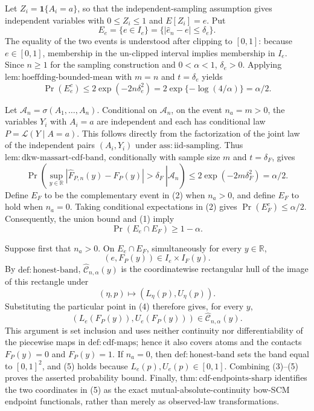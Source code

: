 Let \(Z_i=\mathbf 1\{A_i=a\}\), so that the independent-sampling assumption gives independent variables with \(0\le Z_i\le1\) and \(E[Z_i]=e\).  Put
\[
 E_e=\{e\in I_e\}=\{|\widehat e_n-e|\le\delta_e\}.
\]
The equality of the two events is understood after clipping to \([0,1]\): because \(e\in[0,1]\), membership in the un-clipped interval implies membership in \(I_e\).  Since \(n\ge1\) for the sampling construction and \(0<\alpha<1\), \(\delta_e>0\).  Applying \(\mathrm{lem:hoeffding\text{-}bounded\text{-}mean}\) with \(m=n\) and \(t=\delta_e\) yields
\[
 \Pr(E_e^c)
 \le 2\exp(-2n\delta_e^2)
 =2\exp\{-\log(4/\alpha)\}
 =\alpha/2. \tag{1}
\]

Let \(\mathcal A_n=\sigma(A_1,\ldots,A_n)\).  Conditional on \(\mathcal A_n\), on the event \(n_a=m>0\), the variables \(Y_i\) with \(A_i=a\) are independent and each has conditional law \(P=\mathcal L(Y\mid A=a)\).  This follows directly from the factorization of the joint law of the independent pairs \((A_i,Y_i)\) under \(\mathrm{ass:iid\text{-}sampling}\).  Thus \(\mathrm{lem:dkw\text{-}massart\text{-}cdf\text{-}band}\), conditionally with sample size \(m\) and \(t=\delta_F\), gives
\[
 \Pr\!\left(
   \left.\sup_{y\in\mathbb R}
   |\widehat F_{P,n}(y)-F_P(y)|>\delta_F
   \ \right|\mathcal A_n
 \right)
 \le 2\exp(-2m\delta_F^2)
 =\alpha/2. \tag{2}
\]
Define \(E_F\) to be the complementary event in (2) when \(n_a>0\), and define \(E_F\) to hold when \(n_a=0\).  Taking conditional expectations in (2) gives \(\Pr(E_F^c)\le\alpha/2\).  Consequently, the union bound and (1) imply
\[
 \Pr(E_e\cap E_F)\ge1-\alpha. \tag{3}
\]

Suppose first that \(n_a>0\).  On \(E_e\cap E_F\), simultaneously for every \(y\in\mathbb R\),
\[
 (e,F_P(y))\in I_e\times I_F(y). \tag{4}
\]
By \(\mathrm{def:honest\text{-}band}\), \(\widehat{\mathcal C}_{n,\alpha}(y)\) is the coordinatewise rectangular hull of the image of this rectangle under
\[
 (\eta,p)\longmapsto (L_\eta(p),U_\eta(p)).
\]
Substituting the particular point in (4) therefore gives, for every \(y\),
\[
 (L_e(F_P(y)),U_e(F_P(y)))
 \in\widehat{\mathcal C}_{n,\alpha}(y). \tag{5}
\]
This argument is set inclusion and uses neither continuity nor differentiability of the piecewise maps in \(\mathrm{def:cdf\text{-}maps}\); hence it also covers atoms and the contacts \(F_P(y)=0\) and \(F_P(y)=1\).  If \(n_a=0\), then \(\mathrm{def:honest\text{-}band}\) sets the band equal to \([0,1]^2\), and (5) holds because \(L_e(p),U_e(p)\in[0,1]\).  Combining (3)--(5) proves the asserted probability bound.  Finally, \(\mathrm{thm:cdf\text{-}endpoints\text{-}sharp}\) identifies the two coordinates in (5) as the exact mutual-absolute-continuity bow-SCM endpoint functionals, rather than merely as observed-law transformations.
